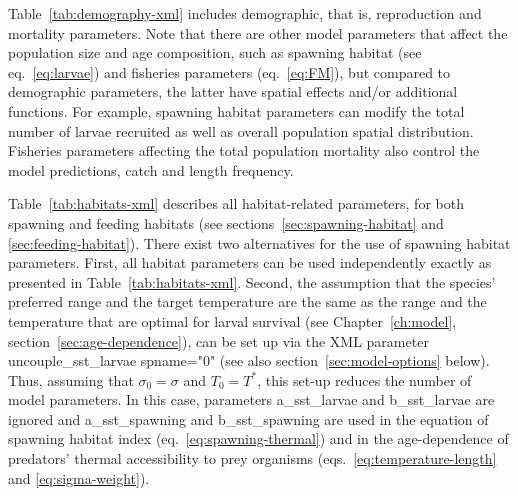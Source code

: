 Table~\ref{tab:demography-xml} includes demographic, that is, reproduction and mortality parameters. Note that there are other model parameters that affect the population size and age composition, such as spawning habitat (see eq.~\ref{eq:larvae}) and fisheries parameters (eq.~\ref{eq:FM}), but compared to demographic parameters, the latter have spatial effects and/or additional functions. For example, spawning habitat parameters can modify the total number of larvae recruited as well as overall population spatial distribution. Fisheries parameters affecting the total population mortality also control the model predictions, catch and length frequency. 

Table~\ref{tab:habitats-xml} describes all habitat-related parameters, for both spawning and feeding habitats (see sections~\ref{sec:spawning-habitat} and \ref{sec:feeding-habitat}). There exist two alternatives for the use of spawning habitat parameters. First, all habitat parameters can be used independently exactly as presented in Table~\ref{tab:habitats-xml}. Second, the assumption that the species' preferred range and the target temperature are the same as the range and the temperature that are optimal for larval survival (see Chapter~\ref{ch:model}, section~\ref{sec:age-dependence}), can be set up via the XML parameter {\ttfamily uncouple\_sst\_larvae spname="0"} (see also section~\ref{sec:model-options} below). Thus, assuming that $\sigma_0=\sigma$ and $T_0=T^*$, this set-up reduces the number of model parameters. In this case, parameters {\ttfamily a\_sst\_larvae} and {\ttfamily b\_sst\_larvae} are ignored and {\ttfamily a\_sst\_spawning} and {\ttfamily b\_sst\_spawning} are used in the equation of spawning habitat index (eq.~\ref{eq:spawning-thermal}) and in the age-dependence of predators' thermal accessibility to prey organisms (eqs.~\ref{eq:temperature-length} and \ref{eq:sigma-weight}).


